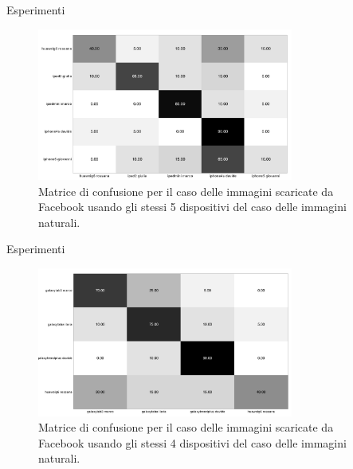 \begin{tframe}{Esperimenti}

\begin{figure}[h]
\begin{center}
\includegraphics[width=0.75\textwidth]{../images/confusion_matrix_fb_highres_5.png}
\end{center}
  \caption{Matrice di confusione per il caso delle immagini scaricate da Facebook usando gli stessi 5 dispositivi del caso delle immagini naturali.}
\label{fig:validation}
\end{figure}

\end{tframe}

\begin{tframe}{Esperimenti}

\begin{figure}[h]
\begin{center}
\includegraphics[width=0.75\textwidth]{../images/confusion_matrix_fb_highres_4.png}
\end{center}
  \caption{Matrice di confusione per il caso delle immagini scaricate da Facebook usando gli stessi 4 dispositivi del caso delle immagini naturali. }
\label{fig:validation}
\end{figure}

\end{tframe}

